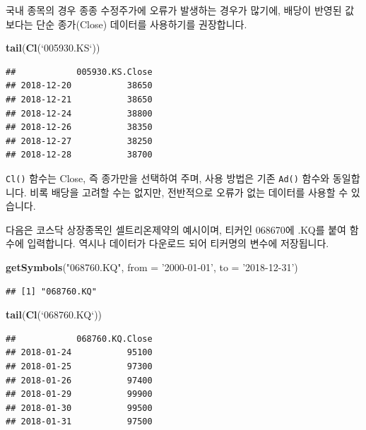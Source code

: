 \documentclass[12pt,]{book}
\newenvironment{Shaded}{\begin{snugshade}}{\end{snugshade}}
\newcommand{\DataTypeTok}[1]{\textcolor[rgb]{0.13,0.29,0.53}{#1}}
\newcommand{\KeywordTok}[1]{\textcolor[rgb]{0.13,0.29,0.53}{\textbf{#1}}}
\newcommand{\NormalTok}[1]{#1}
\newcommand{\StringTok}[1]{\textcolor[rgb]{0.31,0.60,0.02}{#1}}
\begin{document}
국내 종목의 경우 종종 수정주가에 오류가 발생하는 경우가 많기에, 배당이 반영된 값 보다는 단순 종가(Close) 데이터를 사용하기를 권장합니다.

\begin{Shaded}
\begin{Highlighting}[]
\KeywordTok{tail}\NormalTok{(}\KeywordTok{Cl}\NormalTok{(}\StringTok{`}\DataTypeTok{005930.KS}\StringTok{`}\NormalTok{))}
\end{Highlighting}
\end{Shaded}

\begin{verbatim}
##            005930.KS.Close
## 2018-12-20           38650
## 2018-12-21           38650
## 2018-12-24           38800
## 2018-12-26           38350
## 2018-12-27           38250
## 2018-12-28           38700
\end{verbatim}

\texttt{Cl()} 함수는 Close, 즉 종가만을 선택하여 주며, 사용 방법은 기존 \texttt{Ad()} 함수와 동일합니다. 비록 배당을 고려할 수는 없지만, 전반적으로 오류가 없는 데이터를 사용할 수 있습니다.

다음은 코스닥 상장종목인 셀트리온제약의 예시이며, 티커인 068670에 .KQ를 붙여 함수에 입력합니다. 역시나 데이터가 다운로드 되어 티커명의 변수에 저장됩니다.

\begin{Shaded}
\begin{Highlighting}[]
\KeywordTok{getSymbols}\NormalTok{(}\StringTok{"068760.KQ"}\NormalTok{,}
           \DataTypeTok{from =} \StringTok{'2000-01-01'}\NormalTok{, }\DataTypeTok{to =} \StringTok{'2018-12-31'}\NormalTok{)}
\end{Highlighting}
\end{Shaded}

\begin{verbatim}
## [1] "068760.KQ"
\end{verbatim}

\begin{Shaded}
\begin{Highlighting}[]
\KeywordTok{tail}\NormalTok{(}\KeywordTok{Cl}\NormalTok{(}\StringTok{`}\DataTypeTok{068760.KQ}\StringTok{`}\NormalTok{))}
\end{Highlighting}
\end{Shaded}

\begin{verbatim}
##            068760.KQ.Close
## 2018-01-24           95100
## 2018-01-25           97300
## 2018-01-26           97400
## 2018-01-29           99900
## 2018-01-30           99500
## 2018-01-31           97500
\end{verbatim}
\end{document}
